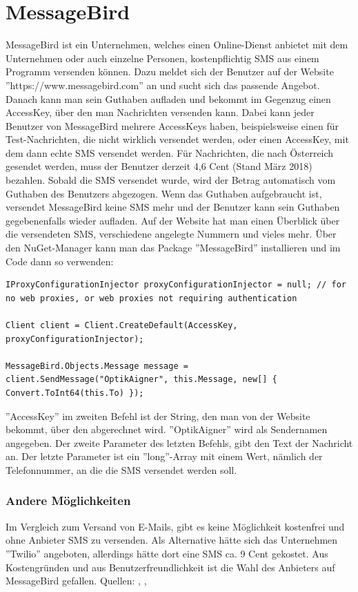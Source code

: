 \section{MessageBird}
MessageBird ist ein Unternehmen, welches einen Online-Dienst anbietet mit dem  Unternehmen oder auch einzelne Personen, kostenpflichtig SMS aus einem Programm versenden können. Dazu meldet sich der Benutzer auf der Website ''https://www.messagebird.com'' an und sucht sich das passende Angebot. Danach kann man sein Guthaben aufladen und bekommt im Gegenzug einen AccessKey, über den man Nachrichten versenden kann. Dabei kann jeder Benutzer von MessageBird mehrere AccessKeys haben, beispielsweise einen für Test-Nachrichten, die nicht wirklich versendet werden, oder einen AccessKey, mit dem dann echte SMS versendet werden. Für Nachrichten, die nach Österreich gesendet werden, muss der Benutzer derzeit 4,6 Cent (Stand März 2018) bezahlen. Sobald die SMS versendet wurde, wird der Betrag automatisch vom Guthaben des Benutzers abgezogen. Wenn das Guthaben aufgebraucht ist, versendet MessageBird keine SMS mehr und der Benutzer kann sein Guthaben gegebenenfalls wieder aufladen. Auf der Website hat man einen Überblick über die versendeten SMS, verschiedene angelegte Nummern und vieles mehr. \newline Über den NuGet-Manager kann man das Package ''MessageBird'' installieren und im Code dann so verwenden:
\begin{lstlisting}
IProxyConfigurationInjector proxyConfigurationInjector = null; // for no web proxies, or web proxies not requiring authentication

Client client = Client.CreateDefault(AccessKey, proxyConfigurationInjector);

MessageBird.Objects.Message message = client.SendMessage("OptikAigner", this.Message, new[] { Convert.ToInt64(this.To) });
\end{lstlisting}
''AccessKey'' im zweiten Befehl ist der String, den man von der Website bekommt, über den abgerechnet wird. ''OptikAigner'' wird als Sendernamen angegeben. Der zweite Parameter des letzten Befehls, gibt den Text der Nachricht an. Der letzte Parameter ist ein ''long''-Array mit einem Wert, nämlich der Telefonnummer, an die die SMS versendet werden soll.

\subsubsection{Andere Möglichkeiten}
Im Vergleich zum Versand von E-Mails, gibt es keine Möglichkeit kostenfrei und ohne Anbieter SMS zu versenden. Als Alternative hätte sich das Unternehmen ''Twilio'' angeboten, allerdings hätte dort eine SMS ca. 9 Cent gekostet. Aus Kostengründen und aus Benutzerfreundlichkeit ist die Wahl des Anbieters auf MessageBird gefallen.
\newline Quellen: \cite{messagebird_sms_2018}, \cite{messagebird_preise_2018}, \cite{twilio_sms_2018}


